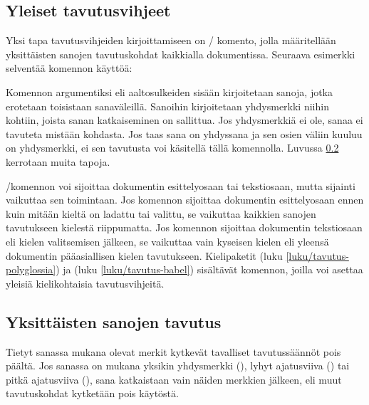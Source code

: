 \subsection{Yleiset tavutusvihjeet}
\label{luku/hyphenation-komento}

Yksi tapa tavutusvihjeiden kirjoittamiseen on \-/
komento, jolla määritellään yksittäisten sanojen tavutuskohdat
kaikkialla dokumentissa. Seuraava esimerkki selventää komennon käyttöä:

\begin{koodilohkosis}
\end{koodilohkosis}

\noindent
Komennon argumentiksi eli aaltosulkeiden sisään kirjoitetaan sanoja,
jotka erotetaan toisistaan sanaväleillä. Sanoihin kirjoitetaan
yhdysmerkki niihin kohtiin, joista sanan katkaiseminen on sallittua. Jos
yhdysmerkkiä ei ole, sanaa ei tavuteta mistään kohdasta. Jos taas sana
on yhdyssana ja sen osien väliin kuuluu on yhdysmerkki, ei sen tavutusta
voi käsitellä tällä komennolla. Luvussa \ref{luku/tavutuksen-merkit}
kerrotaan muita tapoja.

\-/komennon voi sijoittaa dokumentin esittelyosaan
tai tekstiosaan, mutta sijainti vaikuttaa sen toimintaan. Jos komennon
sijoittaa dokumentin esittelyosaan ennen kuin mitään kieltä on ladattu
tai valittu, se vaikuttaa kaikkien sanojen tavutukseen kielestä
riippumatta. Jos komennon sijoittaa dokumentin tekstiosaan eli kielen
valitsemisen jälkeen, se vaikuttaa vain kyseisen kielen eli yleensä
dokumentin pääasiallisen kielen tavutukseen. Kielipaketit
 (luku \ref{luku/tavutus-polyglossia}) ja
 (luku \ref{luku/tavutus-babel}) sisältävät komennon,
joilla voi asettaa yleisiä kielikohtaisia tavutusvihjeitä.

\subsection{Yksittäisten sanojen tavutus}
\label{luku/tavutuksen-merkit}

Tietyt sanassa mukana olevat merkit kytkevät tavalliset tavutussäännöt
pois päältä. Jos sanassa on mukana yksikin yhdysmerkki (\koodi{\=/}),
lyhyt ajatusviiva (\mbox{\koodi{--}}) tai pitkä ajatusviiva
(\mbox{\koodi{---}}), sana katkaistaan vain näiden merkkien jälkeen, eli
muut tavutuskohdat kytketään pois käytöstä.

